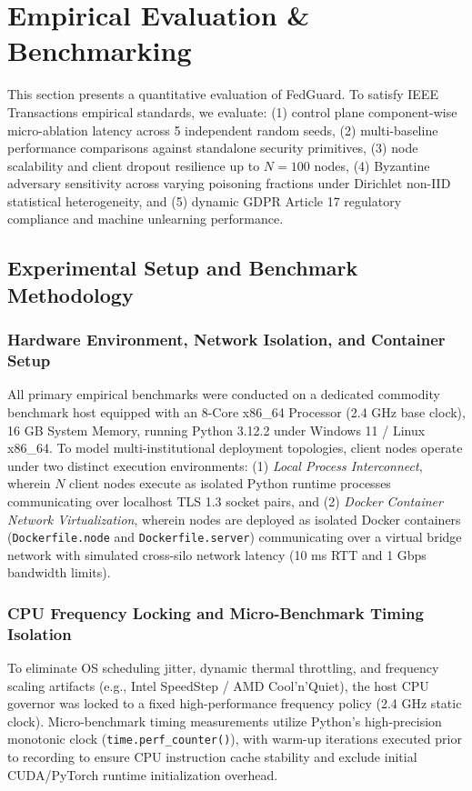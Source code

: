 \section{Empirical Evaluation \& Benchmarking}
\label{sec:evaluation}

This section presents a quantitative evaluation of FedGuard. To satisfy IEEE Transactions empirical standards, we evaluate: (1) control plane component-wise micro-ablation latency across 5 independent random seeds, (2) multi-baseline performance comparisons against standalone security primitives, (3) node scalability and client dropout resilience up to $N=100$ nodes, (4) Byzantine adversary sensitivity across varying poisoning fractions under Dirichlet non-IID statistical heterogeneity, and (5) dynamic GDPR Article 17 regulatory compliance and machine unlearning performance.

\subsection{Experimental Setup and Benchmark Methodology}

\subsubsection{Hardware Environment, Network Isolation, and Container Setup}
All primary empirical benchmarks were conducted on a dedicated commodity benchmark host equipped with an 8-Core x86\_64 Processor (2.4 GHz base clock), 16 GB System Memory, running Python 3.12.2 under Windows 11 / Linux x86\_64. To model multi-institutional deployment topologies, client nodes operate under two distinct execution environments: (1) \emph{Local Process Interconnect}, wherein $N$ client nodes execute as isolated Python runtime processes communicating over localhost TLS 1.3 socket pairs, and (2) \emph{Docker Container Network Virtualization}, wherein nodes are deployed as isolated Docker containers (\texttt{Dockerfile.node} and \texttt{Dockerfile.server}) communicating over a virtual bridge network with simulated cross-silo network latency (10 ms RTT and 1 Gbps bandwidth limits).

\subsubsection{CPU Frequency Locking and Micro-Benchmark Timing Isolation}
To eliminate OS scheduling jitter, dynamic thermal throttling, and frequency scaling artifacts (e.g., Intel SpeedStep / AMD Cool'n'Quiet), the host CPU governor was locked to a fixed high-performance frequency policy (2.4 GHz static clock). Micro-benchmark timing measurements utilize Python's high-precision monotonic clock (\texttt{time.perf\_counter()}), with warm-up iterations executed prior to recording to ensure CPU instruction cache stability and exclude initial CUDA/PyTorch runtime initialization overhead.

